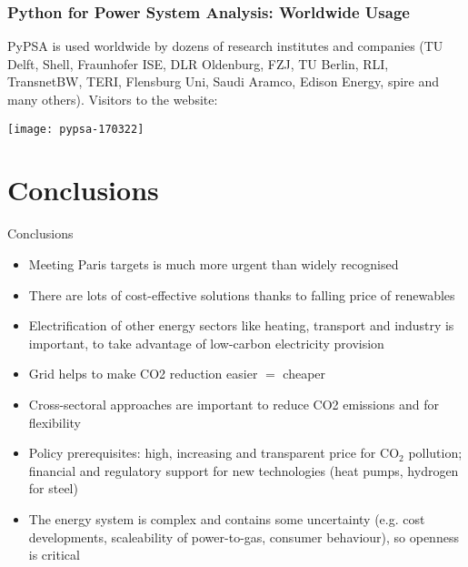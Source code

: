 \documentclass[10pt,aspectratio=169,dvipsnames]{beamer}
\def\co2{CO${}_2$}
\let\olditem\item
\renewcommand{\item}{%
\olditem\vspace{5pt}}
\begin{document}
\begin{frame}
  \frametitle{Python for Power System Analysis: Worldwide Usage}

  PyPSA is used worldwide by \alert{dozens of research institutes and companies} (TU Delft, Shell, Fraunhofer ISE, DLR Oldenburg, FZJ, TU Berlin, RLI, TransnetBW, TERI, Flensburg Uni, Saudi Aramco, Edison Energy, spire and many others). Visitors to the website:

  \centering
  \texttt{[image: pypsa-170322]}


\end{frame}



\section{Conclusions}

\begin{frame}{Conclusions}

  \begin{itemize}
    \item Meeting \alert{Paris targets} is much more urgent than widely recognised

    \item There are \alert{lots of cost-effective solutions} thanks to falling price of renewables

    \item \alert{Electrification of other energy sectors} like heating,
      transport and industry is important,  to take advantage of
      low-carbon electricity provision

    \item \alert{Grid helps} to make CO2 reduction easier $=$ cheaper


    \item \alert{Cross-sectoral} approaches are important to reduce
      CO2 emissions \alert{and} for flexibility

    \item \alert{Policy prerequisites}: high, increasing and
      transparent \alert{price for \co2{} pollution}; financial and regulatory support for \alert{new technologies} (heat pumps, hydrogen for steel)

    \item The energy system is complex and contains some uncertainty
      (e.g. cost developments, scaleability of power-to-gas, consumer behaviour), so
      \alert{openness is critical}

  \end{itemize}

\end{frame}
\end{document}
